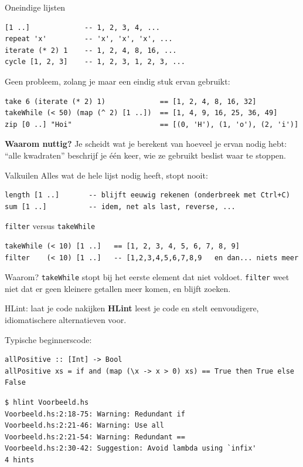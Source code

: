 \documentclass[aspectratio=169,11pt]{beamer}
\newcommand{\hs}{\lstinline[style=hsinline]}
\begin{document}
\begin{frame}[fragile]{Oneindige lijsten}
\begin{lstlisting}[aboveskip=2pt]
[1 ..]             -- 1, 2, 3, 4, ...
repeat 'x'         -- 'x', 'x', 'x', ...
iterate (* 2) 1    -- 1, 2, 4, 8, 16, ...
cycle [1, 2, 3]    -- 1, 2, 3, 1, 2, 3, ...
\end{lstlisting}
Geen probleem, zolang je maar een \alert{eindig stuk} ervan gebruikt:
\begin{lstlisting}[aboveskip=2pt]
take 6 (iterate (* 2) 1)             == [1, 2, 4, 8, 16, 32]
takeWhile (< 50) (map (^ 2) [1 ..])  == [1, 4, 9, 16, 25, 36, 49]
zip [0 ..] "Hoi"                     == [(0, 'H'), (1, 'o'), (2, 'i')]
\end{lstlisting}
\pause
\textbf{Waarom nuttig?} Je scheidt \alert{wat} je berekent van \alert{hoeveel} je ervan nodig hebt: ``alle kwadraten'' beschrijf je één keer, wie ze gebruikt beslist waar te stoppen.
\end{frame}

\begin{frame}[fragile]{Valkuilen}
Alles wat de \alert{hele} lijst nodig heeft, stopt nooit:
\begin{lstlisting}[aboveskip=2pt]
length [1 ..]       -- blijft eeuwig rekenen (onderbreek met Ctrl+C)
sum [1 ..]          -- idem, net als last, reverse, ...
\end{lstlisting}
\pause
\hs|filter| versus \hs|takeWhile|
\begin{lstlisting}[aboveskip=2pt]
takeWhile (< 10) [1 ..]   == [1, 2, 3, 4, 5, 6, 7, 8, 9]
filter    (< 10) [1 ..]   -- [1,2,3,4,5,6,7,8,9   en dan... niets meer
\end{lstlisting}
\begin{alertblock}{Waarom?}
    \hs|takeWhile| stopt bij het \alert{eerste} element dat niet voldoet. \hs|filter| weet niet
    dat er geen kleinere getallen meer komen, en blijft zoeken.
  \end{alertblock}
\end{frame}

\begin{frame}[fragile]{HLint: laat je code nakijken}
  \textbf{HLint} leest je code en stelt \alert{eenvoudigere, idiomatischere}
  alternatieven voor.
  \medskip

  Typische beginnerscode:
\begin{lstlisting}
allPositive :: [Int] -> Bool
allPositive xs = if and (map (\x -> x > 0) xs) == True then True else False
\end{lstlisting}
  \pause
\begin{lstlisting}[language={}]
$ hlint Voorbeeld.hs
Voorbeeld.hs:2:18-75: Warning: Redundant if
Voorbeeld.hs:2:21-46: Warning: Use all
Voorbeeld.hs:2:21-54: Warning: Redundant ==
Voorbeeld.hs:2:30-42: Suggestion: Avoid lambda using `infix'
4 hints
\end{lstlisting}
\end{frame}
\end{document}
